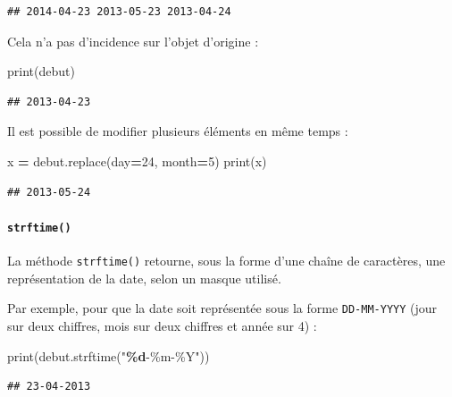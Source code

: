 \documentclass[
  12pt,
]{book}
\newenvironment{Shaded}{\begin{snugshade}}{\end{snugshade}}
\newcommand{\BuiltInTok}[1]{#1}
\newcommand{\DecValTok}[1]{\textcolor[rgb]{0.00,0.00,0.81}{#1}}
\newcommand{\NormalTok}[1]{#1}
\newcommand{\OperatorTok}[1]{\textcolor[rgb]{0.81,0.36,0.00}{\textbf{#1}}}
\newcommand{\SpecialCharTok}[1]{\textcolor[rgb]{0.81,0.36,0.00}{\textbf{#1}}}
\newcommand{\StringTok}[1]{\textcolor[rgb]{0.31,0.60,0.02}{#1}}
\numberwithin{equation}{section}
\numberwithin{countremarque}{section}
\begin{document}
\begin{lstlisting}
## 2014-04-23 2013-05-23 2013-04-24
\end{lstlisting}

Cela n'a pas d'incidence sur l'objet d'origine :

\begin{Shaded}
\begin{Highlighting}[]
\BuiltInTok{print}\NormalTok{(debut)}
\end{Highlighting}
\end{Shaded}

\begin{lstlisting}
## 2013-04-23
\end{lstlisting}

Il est possible de modifier plusieurs éléments en même temps :

\begin{Shaded}
\begin{Highlighting}[]
\NormalTok{x }\OperatorTok{=}\NormalTok{ debut.replace(day}\OperatorTok{=}\DecValTok{24}\NormalTok{, month}\OperatorTok{=}\DecValTok{5}\NormalTok{)}
\BuiltInTok{print}\NormalTok{(x)}
\end{Highlighting}
\end{Shaded}

\begin{lstlisting}
## 2013-05-24
\end{lstlisting}

\paragraph{\texorpdfstring{\texttt{strftime()}}{strftime()}}\label{strftime}

La méthode \texttt{strftime()} retourne, sous la forme d'une chaîne de caractères, une représentation de la date, selon un masque utilisé.

Par exemple, pour que la date soit représentée sous la forme \texttt{DD-MM-YYYY} (jour sur deux chiffres, mois sur deux chiffres et année sur 4) :

\begin{Shaded}
\begin{Highlighting}[]
\BuiltInTok{print}\NormalTok{(debut.strftime(}\StringTok{"}\SpecialCharTok{\%d}\StringTok{{-}\%m{-}\%Y"}\NormalTok{))}
\end{Highlighting}
\end{Shaded}

\begin{lstlisting}
## 23-04-2013
\end{lstlisting}
\end{document}
